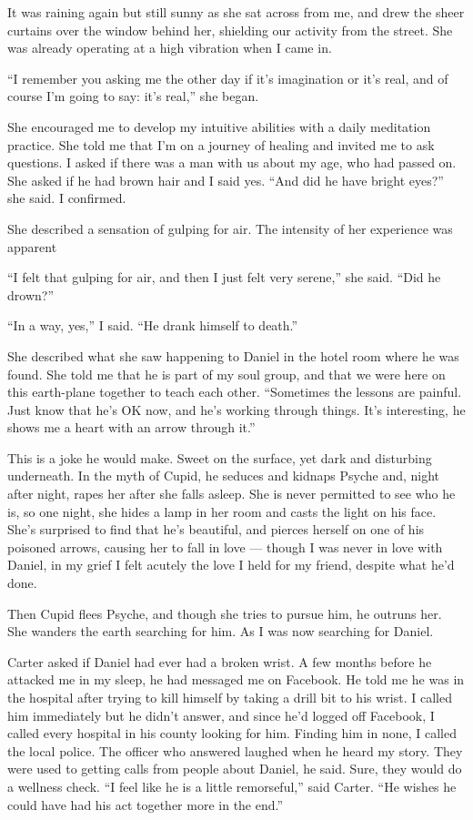 It was raining again but still sunny as she sat across from me, and drew
the sheer curtains over the window behind her, shielding our activity
from the street. She was already operating at a high vibration when I
came in.

``I remember you asking me the other day if it's imagination or it's
real, and of course I'm going to say: it's real,'' she began.

She encouraged me to develop my intuitive abilities with a daily
meditation practice. She told me that I'm on a journey of healing and
invited me to ask questions. I asked if there was a man with us about my
age, who had passed on. She asked if he had brown hair and I said yes.
``And did he have bright eyes?'' she said. I confirmed.

She described a sensation of gulping for air. The intensity of her
experience was apparent

``I felt that gulping for air, and then I just felt very serene,'' she
said. ``Did he drown?''

``In a way, yes,'' I said. ``He drank himself to death.''

She described what she saw happening to Daniel in the hotel room where
he was found. She told me that he is part of my soul group, and that we
were here on this earth-plane together to teach each other. ``Sometimes
the lessons are painful. Just know that he's OK now, and he's working
through things. It's interesting, he shows me a heart with an arrow
through it.''

This is a joke he would make. Sweet on the surface, yet dark and
disturbing underneath. In the myth of Cupid, he seduces and kidnaps
Psyche and, night after night, rapes her after she falls asleep. She is
never permitted to see who he is, so one night, she hides a lamp in her
room and casts the light on his face. She's surprised to find that he's
beautiful, and pierces herself on one of his poisoned arrows, causing
her to fall in love --- though I was never in love with Daniel, in my
grief I felt acutely the love I held for my friend, despite what he'd
done.

Then Cupid flees Psyche, and though she tries to pursue him, he outruns
her. She wanders the earth searching for him. As I was now searching for
Daniel.

Carter asked if Daniel had ever had a broken wrist. A few months before
he attacked me in my sleep, he had messaged me on Facebook. He told me
he was in the hospital after trying to kill himself by taking a drill
bit to his wrist. I called him immediately but he didn't answer, and
since he'd logged off Facebook, I called every hospital in his county
looking for him. Finding him in none, I called the local police. The
officer who answered laughed when he heard my story. They were used to
getting calls from people about Daniel, he said. Sure, they would do a
wellness check. ``I feel like he is a little remorseful,'' said Carter.
``He wishes he could have had his act together more in the end.''

